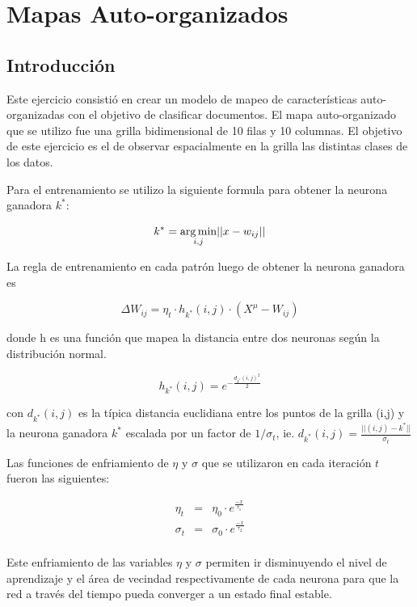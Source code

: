 \section{Mapas Auto-organizados }

\subsection{Introducción}
Este ejercicio consistió en crear un modelo de mapeo de características
auto-organizadas con el objetivo de clasificar documentos. El mapa
auto-organizado que se utilizo fue una grilla bidimensional de 10 filas y 10
columnas. El objetivo de este ejercicio es el de observar espacialmente en la
grilla las distintas clases de los datos.

Para el entrenamiento se utilizo la siguiente formula para obtener la neurona
ganadora $k^*$:

  \[
  k^* = \operatorname*{arg\,min}_{i,j} \lvert\lvert x-w_{ij} \rvert\rvert
  \]

La regla de entrenamiento en cada patrón luego de obtener la neurona ganadora
es

\begin{equation}
	\Delta W_{ij} = \eta_t \cdot h_{k^*}(i,j) \cdot (X^{\mu}-W_{ij})
\end{equation}

donde h es una función que mapea la distancia entre dos neuronas según la
distribución normal.

\[
	h_{k^*}(i, j) = e^{-\frac{d_{k^*}(i,j)^2}{2}}
\]

con $d_{k^*}(i,j)$ es la típica distancia euclidiana entre los puntos de la
grilla (i,j) y la neurona ganadora $k^*$ escalada por un factor de
$1/\sigma_t$, ie.  $ d_{k^*}(i,j) = \frac{\lvert \lvert (i,j)-k^* \rvert
\rvert}{\sigma_t} $

Las funciones de enfriamiento de $\eta$ y $\sigma$ que se utilizaron en cada
iteración $t$ fueron las siguientes:

\[
  \begin{array}{ccc}
    \eta_t & = & \eta_0 \cdot e^{\frac{-x}{\tau_1}} \\
    \sigma_t & = & \sigma_0 \cdot e^{\frac{-x}{\tau_2}} \\
  \end{array}
\]

Este enfriamiento de las variables $\eta$ y $\sigma$ permiten ir disminuyendo
el nivel de aprendizaje y el área de vecindad respectivamente de cada neurona
para que la red a través del tiempo pueda converger a un estado final estable.


